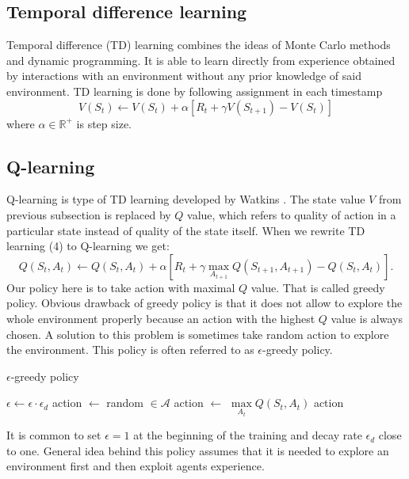 \subsection{Temporal difference learning}
Temporal difference (TD) learning combines the ideas of Monte Carlo methods and dynamic programming. It is able to learn directly from experience obtained by interactions with an environment without any prior knowledge of said environment. TD learning is done by following assignment in each timestamp \cite{sutton2012}
\begin{equation}
V(S_t) \gets V(S_t) + \alpha [R_{t} + \gamma V(S_{t+1}) - V(S_t)]
\end{equation}
where $\alpha \in \mathbb{R}^+$ is step size.

\subsection{Q-learning}
Q-learning is type of TD learning developed by Watkins \cite{watkins1992}. The state value $V$ from previous subsection is replaced by $Q$ value, which refers to quality of action in a particular state instead of quality of the state itself. When we rewrite TD learning (4) to Q-learning we get:
\begin{equation}
Q(S_t, A_t) \gets Q(S_t, A_t) + \alpha [R_{t} + \gamma \underset{A_{t+1}}{\max} Q(S_{t+1}, A_{t+1}) - Q(S_t, A_t)].
\end{equation}
Our policy here is to take action with maximal $Q$ value. That is called greedy policy. Obvious drawback of greedy policy is that it does not allow to explore the whole environment properly because an action with the highest $Q$ value is always chosen. A solution to this problem is sometimes take random action to explore the environment. This policy is often referred to as $\epsilon$-greedy policy.

\begin{algorithm}
\caption{$\epsilon$-greedy policy}
\begin{algorithmic}[1]
\State $\epsilon \gets \epsilon \cdot \epsilon_d$
\State action $\gets$ random $\in \mathcal{A}$
\Else 
\State action $\gets$ $\underset{A_t}{\max} Q(S_t, A_t)$
\EndIf
\State \Return action
\EndProcedure
\end{algorithmic}
\end{algorithm}

It is common to set $\epsilon = 1$ at the beginning of the training and decay rate $\epsilon_d$ close to one. General idea behind this policy assumes that it is needed to explore an environment first and then exploit agents experience.

